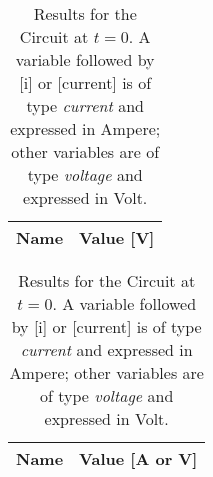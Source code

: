 \begin{table}[htb!]
  \centering
  \begin{tabular}{|l|r|}
      \hline    
      {\bf Name} & {\bf Value [V]} \\ \hline
      
  \end{tabular}
\quad
  \begin{tabular}{|l|r|}
    \hline    
    {\bf Name} & {\bf Value [A or V]} \\ \hline
    
  \end{tabular}
  \caption{Results for the Circuit at $t=0$. A variable followed by [i] or [current] is of type {\em current} and expressed in Ampere; other variables are of type {\it voltage} and expressed in Volt.}
  \label{tab:t0_all}
\end{table}




